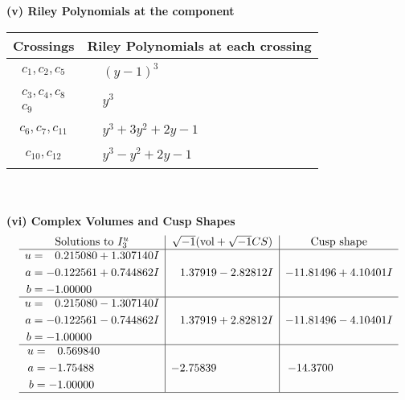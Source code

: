\documentclass[1p]{elsarticle_modified}
\theoremstyle{definition}
\newcommand{\I}{\sqrt{-1}}
\begin{document}
\newpage\renewcommand{\arraystretch}{1}
\flushleft \textbf{(v) Riley Polynomials at the component}\newline \\
\begin{tabular}{m{50pt}|m{274pt}}
Crossings & \hspace{64pt}Riley Polynomials at each crossing \\
\hline $$\begin{aligned}c_{1},c_{2},c_{5}\end{aligned}$$&$\begin{aligned}
&(y-1)^3
\end{aligned}$\\
\hline $$\begin{aligned}c_{3},c_{4},c_{8}\\c_{9}\end{aligned}$$&$\begin{aligned}
&y^3
\end{aligned}$\\
\hline $$\begin{aligned}c_{6},c_{7},c_{11}\end{aligned}$$&$\begin{aligned}
&y^3+3 y^2+2 y-1
\end{aligned}$\\
\hline $$\begin{aligned}c_{10},c_{12}\end{aligned}$$&$\begin{aligned}
&y^3- y^2+2 y-1
\end{aligned}$\\
\hline
\end{tabular}\\~\\
\newpage\flushleft \textbf{(vi) Complex Volumes and Cusp Shapes}
$$\begin{array}{c|c|c}  
\text{Solutions to }I^u_{3}& \I (\text{vol} + \sqrt{-1}CS) & \text{Cusp shape}\\
 \hline 
\begin{aligned}
u &= \phantom{-}0.215080 + 1.307140 I \\
a &= -0.122561 + 0.744862 I \\
b &= -1.00000\phantom{ +0.000000I}\end{aligned}
 & \phantom{-}1.37919 - 2.82812 I & -11.81496 + 4.10401 I \\ \hline\begin{aligned}
u &= \phantom{-}0.215080 - 1.307140 I \\
a &= -0.122561 - 0.744862 I \\
b &= -1.00000\phantom{ +0.000000I}\end{aligned}
 & \phantom{-}1.37919 + 2.82812 I & -11.81496 - 4.10401 I \\ \hline\begin{aligned}
u &= \phantom{-}0.569840\phantom{ +0.000000I} \\
a &= -1.75488\phantom{ +0.000000I} \\
b &= -1.00000\phantom{ +0.000000I}\end{aligned}
 & -2.75839\phantom{ +0.000000I} & -14.3700\phantom{ +0.000000I}\\
 \hline 
 \end{array}$$\newpage
\end{document}
